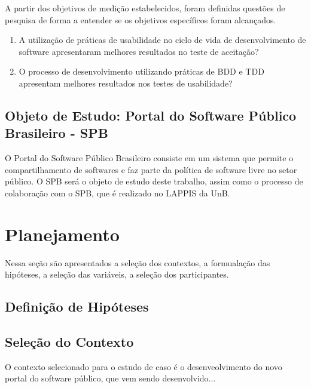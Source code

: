 A partir dos objetivos de medição estabelecidos, foram definidas questões de pesquisa de forma a entender se os objetivos específicos foram alcançados.

\begin{enumerate}
\item A utilização de práticas de usabilidade no ciclo de vida de desenvolvimento de software apresentaram melhores resultados no teste de aceitação?
\item O processo de desenvolvimento utilizando práticas de BDD e TDD apresentam melhores resultados nos testes de usabilidade?
\end{enumerate}


\subsection{Objeto de Estudo: Portal do Software Público Brasileiro - SPB}

O Portal do Software Público Brasileiro consiste em um sistema que permite o compartilhamento de softwares e faz parte da política de software livre no setor público.
O SPB será o objeto de estudo deste trabalho, assim como o processo de colaboração com o SPB, que é realizado no LAPPIS da UnB.

\section{Planejamento}

Nessa seção são apresentados a seleção dos contextos, a formualação das hipóteses, a seleção das variáveis, a seleção dos participantes.


\subsection{Definição de Hipóteses}


\subsection{Seleção do Contexto}

O contexto selecionado para o estudo de caso é o desenveolvimento do novo portal do software público, que vem sendo desenvolvido...


